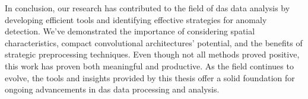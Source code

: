 In conclusion, our research has contributed to the field of \acrshort{das} data analysis by developing efficient tools and identifying effective strategies for anomaly detection. We've demonstrated the importance of considering spatial characteristics, compact convolutional architectures' potential, and the benefits of strategic preprocessing techniques. Even though not all methods proved positive, this work has proven both meaningful and productive. As the field continues to evolve, the tools and insights provided by this thesis offer a solid foundation for ongoing advancements in \acrshort{das} data processing and analysis.


%
%
